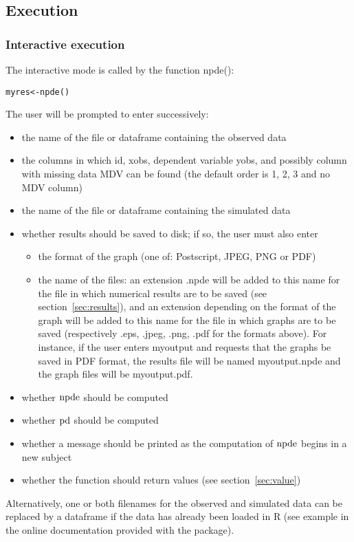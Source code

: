 \subsection{Execution}

\subsubsection{Interactive execution}

\hskip 18pt The interactive mode is called by the function {\sf npde()}: 
\begin{verbatim} 
myres<-npde() 
\end{verbatim} 
The user will be prompted to enter successively: 
\begin{itemize} \item the name of the file or dataframe containing the observed data 
\item the columns in which id, xobs, dependent variable yobs, and possibly 
column with missing data MDV can be found (the default order is 1, 2, 3 and no MDV column) \item the name of the 
file or dataframe containing the simulated data 
\item whether results should be saved to disk; if so, the user must also enter 
    \begin{itemize} 
    \item the format of the graph (one of: Postscript, JPEG, PNG or PDF) 
    \item the name of the files: an extension {\sf .npde} will be added to this name for the file in which 
numerical     results are to be saved (see section~\ref{sec:results}), and an extension depending on the format of 
the graph will     be added to this name for the file in which graphs are to be saved (respectively .eps, .jpeg, 
.png, .pdf for the     formats above). For instance, if the user enters {\sf myoutput} and requests that the graphs 
be saved in PDF     format, the results file will be named {\sf myoutput.npde} and the graph files will be {\sf 
myoutput.pdf}. 
    \end{itemize} 
\item whether ${\rm npde}$ should be computed \item whether ${\rm pd}$ should be computed \item whether a message should be 
printed as the computation of ${\rm npde}$ begins in a new subject 
\item whether the function should return values (see section~\ref{sec:value}) 
\end{itemize} 
Alternatively, one or both filenames for the observed and simulated data 
can be replaced by a dataframe if the data has already been loaded in {\sf R} (see example in the online 
documentation provided with the package).


